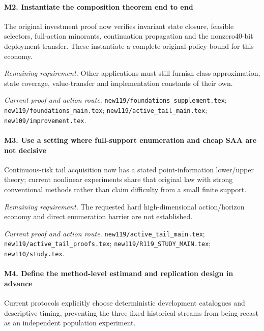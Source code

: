 \paragraph{M2. Instantiate the composition theorem end to end}

The original investment proof now verifies invariant state closure, feasible selectors, full-action minorants, continuation propagation and the nonzero40-bit deployment transfer. These instantiate a complete original-policy bound for this economy.

\par\emph{Remaining requirement.} Other applications must still furnish class approximation, state coverage, value-transfer and implementation constants of their own.

\par\emph{Current proof and action route.} \nolinkurl{new119/foundations_supplement.tex}; \nolinkurl{new119/foundations_main.tex}; \nolinkurl{new119/active_tail_main.tex}; \nolinkurl{new109/improvement.tex}.

\paragraph{M3. Use a setting where full-support enumeration and cheap SAA are not decisive}

Continuous-risk tail acquisition now has a stated point-information lower/\allowbreak{}upper theory; current nonlinear experiments share that original law with strong conventional methods rather than claim difficulty from a small finite support.

\par\emph{Remaining requirement.} The requested hard high-dimensional action/\allowbreak{}horizon economy and direct enumeration barrier are not established.

\par\emph{Current proof and action route.} \nolinkurl{new119/active_tail_main.tex}; \nolinkurl{new119/active_tail_proofs.tex}; \nolinkurl{new119/R119_STUDY_MAIN.tex}; \nolinkurl{new110/study.tex}.

\paragraph{M4. Define the method-level estimand and replication design in advance}

Current protocols explicitly choose deterministic development catalogues and descriptive timing, preventing the three fixed historical streams from being recast as an independent population experiment.


